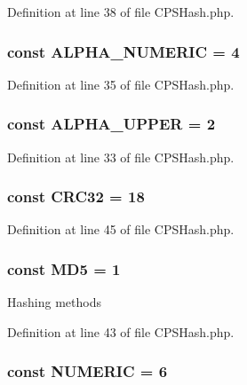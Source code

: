 Definition at line 38 of file CPSHash.php.

\hypertarget{classCPSHash_a1acce0cfa5c3723599af4c7e325b4312}{
\subsubsection[{ALPHA\_\-NUMERIC}]{\setlength{\rightskip}{0pt plus 5cm}const {\bf ALPHA\_\-NUMERIC} = 4}}
\label{classCPSHash_a1acce0cfa5c3723599af4c7e325b4312}


Definition at line 35 of file CPSHash.php.

\hypertarget{classCPSHash_a13afa6f8ce77da9bd4a5af5d473d0d8b}{
\subsubsection[{ALPHA\_\-UPPER}]{\setlength{\rightskip}{0pt plus 5cm}const {\bf ALPHA\_\-UPPER} = 2}}
\label{classCPSHash_a13afa6f8ce77da9bd4a5af5d473d0d8b}


Definition at line 33 of file CPSHash.php.

\hypertarget{classCPSHash_aeeccfbe476a8ab58ea0c3382287ff0e9}{
\subsubsection[{CRC32}]{\setlength{\rightskip}{0pt plus 5cm}const {\bf CRC32} = 18}}
\label{classCPSHash_aeeccfbe476a8ab58ea0c3382287ff0e9}


Definition at line 45 of file CPSHash.php.

\hypertarget{classCPSHash_a66be2064e952a39f04c0a54d83d1c779}{
\subsubsection[{MD5}]{\setlength{\rightskip}{0pt plus 5cm}const {\bf MD5} = 1}}
\label{classCPSHash_a66be2064e952a39f04c0a54d83d1c779}
Hashing methods 

Definition at line 43 of file CPSHash.php.

\hypertarget{classCPSHash_a19cabff2391d99103d1bf11b0ed2972e}{
\subsubsection[{NUMERIC}]{\setlength{\rightskip}{0pt plus 5cm}const {\bf NUMERIC} = 6}}
\label{classCPSHash_a19cabff2391d99103d1bf11b0ed2972e}



